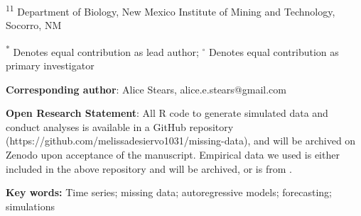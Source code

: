\documentclass[12pt,english]{article} %
\begin{document}
\noindent\textsuperscript{11} Department of Biology, New Mexico Institute of Mining and Technology, Socorro, NM

\noindent\textsuperscript{*} Denotes equal contribution as lead author; {$^{\circ}$} Denotes equal contribution as primary investigator

\noindent \textbf{Corresponding author}: Alice Stears, alice.e.stears@gmail.com 


\noindent \textbf{Open Research Statement}: All R code to generate simulated data and conduct analyses is available in a GitHub repository (https://github.com/melissadesiervo1031/missing-data), and will be archived on Zenodo upon acceptance of the manuscript. Empirical data we used is either included in the above repository and will be archived, or is from \citet{appling_metabolic_2018}. 

\noindent \textbf{Key words:} Time series; missing data; autoregressive models; forecasting; simulations


\clearpage
\end{document}
